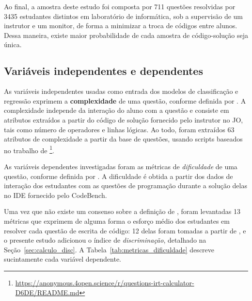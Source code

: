 \documentclass[12pt]{article}
\begin{document}
Ao final, a amostra deste estudo foi composta por 711 questões resolvidas por 3435 estudantes distintos em laboratório de informática, sob a supervisão de um instrutor e um monitor, de forma a minimizar a troca de códigos entre alunos. Dessa maneira, existe maior probabilidade de cada amostra de código-solução seja única.

\subsection{Variáveis independentes e dependentes}

As variáveis independentes usadas como entrada dos modelos de classificação e regressão exprimem a \textbf{complexidade} de uma questão, conforme definida por \cite{pelanek2022complexity}. A complexidade independe da interação do aluno com a questão e consiste em atributos extraídos a partir do código de solução fornecido pelo instrutor no JO, tais como número de operadores e linhas lógicas. Ao todo, foram extraídos 63 atributos de complexidade a partir da base de questões, usando scripts baseados no trabalho de \cite{marcos2021}\footnote{\url{https://anonymous.4open.science/r/questions-irt-calculator-D6DE/README.md}}.

As variáveis dependentes investigadas foram as métricas de \textit{dificuldade} de uma questão, conforme definida por \cite{pelanek2022complexity}. A dificuldade é obtida a partir dos dados de interação dos estudantes com as questões de programação durante a solução delas no IDE fornecido pelo CodeBench. 

Uma vez que não existe um consenso sobre a definição de , foram levantadas 13 métricas que exprimem de alguma forma o esforço médio dos estudantes em resolver cada questão de escrita de código: 12 delas foram tomadas a partir de \cite{jackson2023}, e o presente estudo adicionou o índice de \textit{discriminação}, detalhado na Seção~\ref{sec:calculo_disc}. A Tabela~\ref{tab:metricas_dificuldade} descreve sucintamente cada variável dependente.
\end{document}
